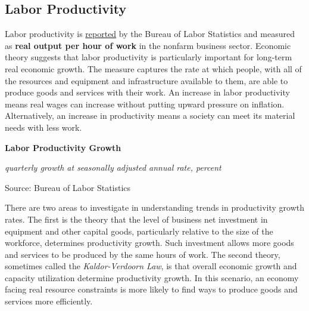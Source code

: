 \documentclass{report}
\makeatletter
\newcommand{\tbllink}[1]{\href{https://raw.githubusercontent.com/bdecon/US-chartbook/master/chartbook/data/#1}{\faTable}}
\newcommand*\short[1]{\expandafter\@gobbletwo\number\numexpr#1\relax}
\newcommand{\sbar}[4]{
		\addplot[ybar stacked, bar width=2.6pt, draw opacity=0, fill=#1] 
			table [x=#2, y=#3, col sep=comma]{#4};}
\newcommand{\dateaxisticks}{
		date coordinates in=x, axis line style={draw=none},
		xmax={2020-08-10},
		max space between ticks=40,	    
		xtick={{1990-01-01}, {1992-01-01}, {1994-01-01}, 
			{1996-01-01}, {1998-01-01}, {2000-01-01}, 
			{2002-01-01}, {2004-01-01}, {2006-01-01},
			{2008-01-01}, {2010-01-01}, {2012-01-01}, {2014-01-01},
		    {2016-01-01}, {2018-01-01}, {2020-01-01}},
		minor xtick={{1989-01-01}, {1991-01-01}, {1993-01-01},
			{1995-01-01}, {1997-01-01}, {1999-01-01}, 
			{2001-01-01}, {2003-01-01}, {2005-01-01}, {2007-01-01},
		    {2009-01-01}, {2011-01-01}, {2013-01-01}, {2015-01-01},
		    {2017-01-01}, {2019-01-01}},
		enlarge y limits={0.06}, enlarge x limits={0.01},
		}
\newcommand{\bbar}[2]{extra #1 ticks = {{#2}}, extra #1 tick labels = ,
		extra #1 tick style = {grid=major, grid style={thick, black!25}},}
\newcommand{\rbars}{
		\fill[color=black!10] (axis cs:{1990-07-01},\pgfkeysvalueof{/pgfplots/ymin}) rectangle 
			(axis cs:{1991-03-01}, \pgfkeysvalueof{/pgfplots/ymax});
		\fill[color=black!10] (axis cs:{2007-12-01},\pgfkeysvalueof{/pgfplots/ymin}) rectangle 
			(axis cs:{2009-07-01}, \pgfkeysvalueof{/pgfplots/ymax});
		\fill[color=black!10] (axis cs:{2001-03-01},\pgfkeysvalueof{/pgfplots/ymin}) rectangle 
			(axis cs:{2001-11-01}, \pgfkeysvalueof{/pgfplots/ymax});
		\fill[color=black!10] (axis cs:{2020-02-01},\pgfkeysvalueof{/pgfplots/ymin}) rectangle 
			(axis cs:{2020-09-01}, \pgfkeysvalueof{/pgfplots/ymax});}
\makeatother
\begin{document}
{{{{{{{{{\newpage

\begin{minipage}{0.76\textwidth}


\subsection*{\color{black!70} \seriffont Labor Productivity}

\small Labor productivity is \href{https://www.bls.gov/news.release/prod2.nr0.htm}{reported} by the Bureau of Labor Statistics and measured as \textbf{real output per hour of work} in the nonfarm business sector. Economic theory suggests that labor productivity is particularly important for long-term real economic growth. The measure captures the rate at which people, with all of the resources and equipment and infrastructure available to them, are able to produce goods and services with their work. An increase in labor productivity means real wages can increase without putting upward pressure on inflation. Alternatively, an increase in productivity means a society can meet its material needs with less work.\\


\vspace{5mm}

\normalsize \textbf{Labor Productivity Growth}

\footnotesize{\textit{quarterly growth at seasonally adjusted annual rate, percent}}

\hspace*{-2mm} 

\footnotesize{Source: Bureau of Labor Statistics} \hfill \tbllink{lprod.csv}

\vspace{5mm}

\small There are two areas to investigate in understanding trends in productivity growth rates. The first is the theory that the level of business net investment in equipment and other capital goods, particularly relative to the size of the workforce, determines productivity growth. Such investment allows more goods and services to be produced by the same hours of work. The second theory, sometimes called the \textit{Kaldor-Verdoorn Law}, is that overall economic growth and capacity utilization determine productivity growth. In this scenario, an economy facing real resource constraints is more likely to find ways to produce goods and services more efficiently.\\



\end{minipage}}}}}}}}}}
\end{document}
